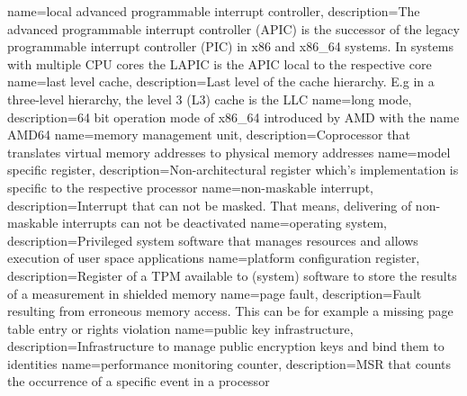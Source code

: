 %
{
    name=local advanced programmable interrupt controller,
    description={The advanced programmable interrupt controller (APIC) is the successor of the legacy programmable
            interrupt controller (PIC) in x86 and x86\_64 systems. In systems with multiple CPU cores the LAPIC is the
            APIC local to the respective core}
}
{
    name=last level cache,
    description={Last level of the cache hierarchy. E.g in a three-level hierarchy, the level 3 (L3) cache is the LLC}
}
{
    name=long mode,
    description={64 bit operation mode of x86\_64 introduced by AMD with the name AMD64}
}
%
{
    name=memory management unit,
    description={Coprocessor that translates virtual memory addresses to physical memory addresses}
}
{
    name=model specific register,
    description={Non-architectural register which's implementation is specific to the respective processor}
}
%
{
    name=non-maskable interrupt,
    description={Interrupt that can not be masked. That means, delivering of non-maskable interrupts can not be
            deactivated}
}
%
{
    name=operating system,
    description={Privileged system software that manages resources and allows execution of user space applications}
}
%
{
    name=platform configuration register,
    description={Register of a TPM available to (system) software to store the results of a measurement in shielded
            memory}
}
{
    name=page fault,
    description={Fault resulting from erroneous memory access. This can be for example a missing page table entry or
            rights violation}
}
{
    name=public key infrastructure,
    description={Infrastructure to manage public encryption keys and bind them to identities}
}
{
    name=performance monitoring counter,
    description={MSR that counts the occurrence of a specific event in a processor}
}

